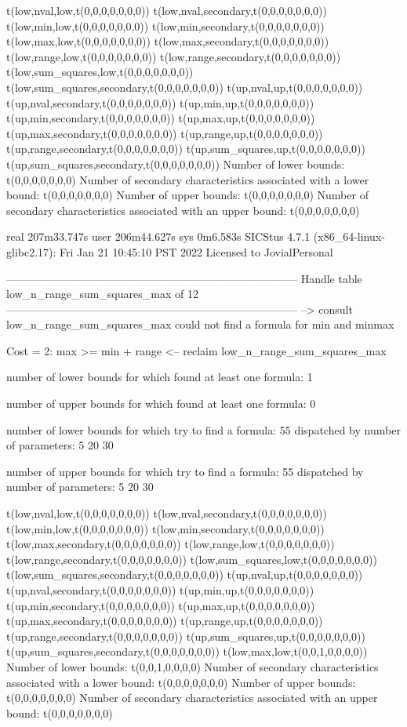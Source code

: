 t(low,nval,low,t(0,0,0,0,0,0,0))
t(low,nval,secondary,t(0,0,0,0,0,0,0))
t(low,min,low,t(0,0,0,0,0,0,0))
t(low,min,secondary,t(0,0,0,0,0,0,0))
t(low,max,low,t(0,0,0,0,0,0,0))
t(low,max,secondary,t(0,0,0,0,0,0,0))
t(low,range,low,t(0,0,0,0,0,0,0))
t(low,range,secondary,t(0,0,0,0,0,0,0))
t(low,sum_squares,low,t(0,0,0,0,0,0,0))
t(low,sum_squares,secondary,t(0,0,0,0,0,0,0))
t(up,nval,up,t(0,0,0,0,0,0,0))
t(up,nval,secondary,t(0,0,0,0,0,0,0))
t(up,min,up,t(0,0,0,0,0,0,0))
t(up,min,secondary,t(0,0,0,0,0,0,0))
t(up,max,up,t(0,0,0,0,0,0,0))
t(up,max,secondary,t(0,0,0,0,0,0,0))
t(up,range,up,t(0,0,0,0,0,0,0))
t(up,range,secondary,t(0,0,0,0,0,0,0))
t(up,sum_squares,up,t(0,0,0,0,0,0,0))
t(up,sum_squares,secondary,t(0,0,0,0,0,0,0))
Number of lower bounds:                                             t(0,0,0,0,0,0,0)
Number of secondary characteristics associated with a lower bound:  t(0,0,0,0,0,0,0)
Number of upper bounds:                                             t(0,0,0,0,0,0,0)
Number of secondary characteristics associated with an upper bound: t(0,0,0,0,0,0,0)

real	207m33.747s
user	206m44.627s
sys	0m6.583s
SICStus 4.7.1 (x86_64-linux-glibc2.17): Fri Jan 21 10:45:10 PST 2022
Licensed to JovialPersonal


--------------------------------------------------------------------------------
Handle table low_n_range_sum_squares_max of 12
--------------------------------------------------------------------------------
--> consult low_n_range_sum_squares_max
could not find a formula for min and minmax

Cost =  2:  max >= min + range
<-- reclaim low_n_range_sum_squares_max

number of lower bounds for which found at least one formula: 1

number of upper bounds for which found at least one formula: 0

number of lower bounds for which try to find a formula: 55
dispatched by number of parameters: 5  20  30

number of upper bounds for which try to find a formula: 55
dispatched by number of parameters: 5  20  30

t(low,nval,low,t(0,0,0,0,0,0,0))
t(low,nval,secondary,t(0,0,0,0,0,0,0))
t(low,min,low,t(0,0,0,0,0,0,0))
t(low,min,secondary,t(0,0,0,0,0,0,0))
t(low,max,secondary,t(0,0,0,0,0,0,0))
t(low,range,low,t(0,0,0,0,0,0,0))
t(low,range,secondary,t(0,0,0,0,0,0,0))
t(low,sum_squares,low,t(0,0,0,0,0,0,0))
t(low,sum_squares,secondary,t(0,0,0,0,0,0,0))
t(up,nval,up,t(0,0,0,0,0,0,0))
t(up,nval,secondary,t(0,0,0,0,0,0,0))
t(up,min,up,t(0,0,0,0,0,0,0))
t(up,min,secondary,t(0,0,0,0,0,0,0))
t(up,max,up,t(0,0,0,0,0,0,0))
t(up,max,secondary,t(0,0,0,0,0,0,0))
t(up,range,up,t(0,0,0,0,0,0,0))
t(up,range,secondary,t(0,0,0,0,0,0,0))
t(up,sum_squares,up,t(0,0,0,0,0,0,0))
t(up,sum_squares,secondary,t(0,0,0,0,0,0,0))
t(low,max,low,t(0,0,1,0,0,0,0))
Number of lower bounds:                                             t(0,0,1,0,0,0,0)
Number of secondary characteristics associated with a lower bound:  t(0,0,0,0,0,0,0)
Number of upper bounds:                                             t(0,0,0,0,0,0,0)
Number of secondary characteristics associated with an upper bound: t(0,0,0,0,0,0,0)

